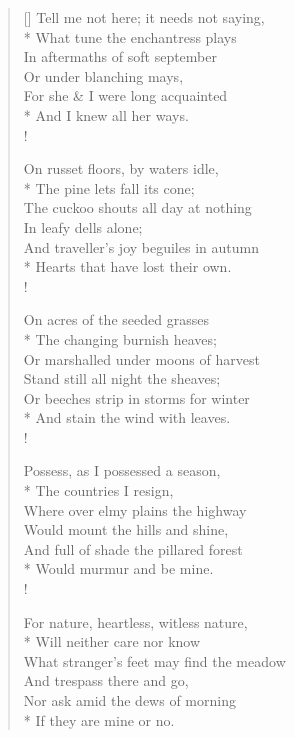 \documentclass[MAIN]{subfiles}
\begin{document}
\settowidth{\versewidth}{Tell me not here; it needs not saying,}
\begin{verse}[\versewidth]
Tell me not here; it needs not saying,\\*
\vin What tune the enchantress plays\\
In aftermaths of soft september\\
\vin Or under blanching mays,\\
For she \& I were long acquainted\\*
\vin And I knew all her ways.\\!

On russet floors, by waters idle,\\*
\vin The pine lets fall its cone;\\
The cuckoo shouts all day at nothing\\
\vin In leafy dells alone;\\
And traveller's joy beguiles in autumn\\*
\vin Hearts that have lost their own.\\!

On acres of the seeded grasses\\*
\vin The changing burnish heaves;\\
Or marshalled under moons of harvest\\
\vin Stand still all night the sheaves;\\
Or beeches strip in storms for winter\\*
\vin And stain the wind with leaves.\\!

Possess, as I possessed a season,\\*
\vin The countries I resign,\\
Where over elmy plains the highway\\
\vin Would mount the hills and shine,\\
And full of shade the pillared forest\\*
\vin Would murmur and be mine.\\!

For nature, heartless, witless nature,\\*
\vin Will neither care nor know\\
What stranger's feet may find the meadow\\
\vin And trespass there and go,\\
Nor ask amid the dews of morning\\*
\vin If they are mine or no.
\end{verse}
\end{document}
